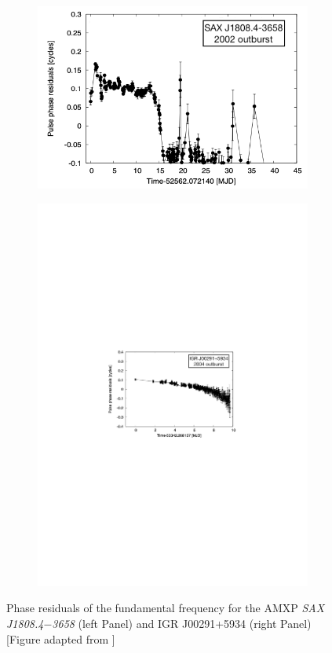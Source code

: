 \documentclass[graybox]{svmult}
\def \saxj{{\em SAX J1808.4$-$3658\xspace}}
\begin{document}
\begin{figure}
\begin{subfigure}{.5\textwidth}
  \centering
  \includegraphics[width=.8\linewidth]{REVIEW_AMXP/1808_phases}
  \label{fig:sfig1}
\end{subfigure}%
\begin{subfigure}{.5\textwidth}
  \centering
  \includegraphics[width=0.9\linewidth]{REVIEW_AMXP/00291_phases_2}
  \label{fig:sfig2}
\end{subfigure}
\caption{Phase residuals of the fundamental frequency for the AMXP \saxj{} (left Panel) and IGR J00291+5934 (right Panel) [Figure adapted from \cite{Patruno2009d}]}
\label{fig:tim_noise}
\end{figure}
\end{document}
